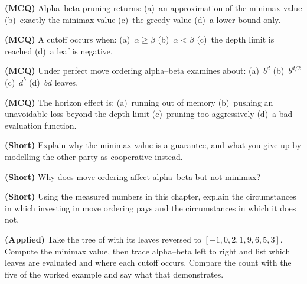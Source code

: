 \begin{reviewq}
  \item \textbf{(MCQ)} Alpha--beta pruning returns: (a)~an approximation of the
        minimax value (b)~exactly the minimax value (c)~the greedy value
        (d)~a lower bound only.
  \item \textbf{(MCQ)} A cutoff occurs when: (a)~$\alpha \ge \beta$
        (b)~$\alpha < \beta$ (c)~the depth limit is reached (d)~a leaf is
        negative.
  \item \textbf{(MCQ)} Under perfect move ordering alpha--beta examines about:
        (a)~$b^{d}$ (b)~$b^{d/2}$ (c)~$d^{b}$ (d)~$bd$ leaves.
  \item \textbf{(MCQ)} The horizon effect is: (a)~running out of memory
        (b)~pushing an unavoidable loss beyond the depth limit (c)~pruning too
        aggressively (d)~a bad evaluation function.
  \item \textbf{(Short)} Explain why the minimax value is a guarantee, and what you
        give up by modelling the other party as cooperative instead.
  \item \textbf{(Short)} Why does move ordering affect alpha--beta but not minimax?
  \item \textbf{(Short)} Using the measured numbers in this chapter, explain the
        circumstances in which investing in move ordering pays and the
        circumstances in which it does not.
  \item \textbf{(Applied)} Take the tree of  with its leaves
        reversed to $[-1, 0, 2, 1, 9, 6, 5, 3]$. Compute the minimax value, then
        trace alpha--beta left to right and list which leaves are evaluated and
        where each cutoff occurs. Compare the count with the five of the worked
        example and say what that demonstrates.
\end{reviewq}
